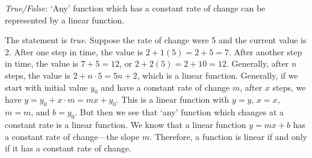 \documentclass[11pt,letterpaper]{article}
\begin{document}
\quizsol \textit{True/False}: `Any' function which has a constant rate of change can be represented by a linear function. \pspace

\sol The statement is \textit{true}. Suppose the rate of change were 5 and the current value is 2. After one step in time, the value is $2 + 1(5)= 2 + 5= 7$. After another step in time, the value is $7 + 5= 12$, or $2 + 2(5)= 2 + 10= 12$. Generally, after $n$ steps, the value is $2 + n \cdot 5= 5n + 2$, which is a linear function. Generally, if we start with initial value $y_0$ and have a constant rate of change $m$, after $x$ steps, we have $y= y_0 + x \cdot m= mx + y_0$. This is a linear function with $y= y$, $x= x$, $m= m$, and $b= y_0$. But then we see that `any' function which changes at a constant rate is a linear function. We know that a linear function $y= mx + b$ has a constant rate of change---the slope $m$. Therefore, a function is linear if and only if it has a constant rate of change. 
\end{document}
